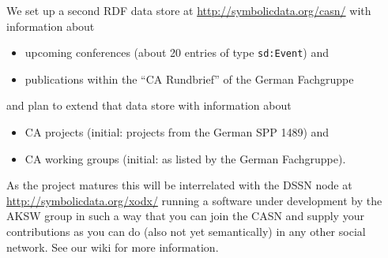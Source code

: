 \documentclass{llncs}
\begin{document}
We set up a second RDF data store at \url{http://symbolicdata.org/casn/} with
information about 
\begin{itemize}
\item upcoming conferences (about 20 entries of type \texttt{sd:Event}) and
\item publications within the ``CA Rundbrief'' of the German Fachgruppe
\end{itemize}
and plan to extend that data store with information about
\begin{itemize}
\item CA projects (initial: projects from the German SPP 1489) and
\item CA working groups (initial: as listed by the German Fachgruppe). 
\end{itemize}
As the project matures this will be interrelated with the DSSN node at
\url{http://symbolicdata.org/xodx/} running a software under development by
the AKSW group in such a way that you can join the CASN and supply your
contributions as you can do (also not yet semantically) in any other social
network.  See our wiki for more information.
\end{document}
